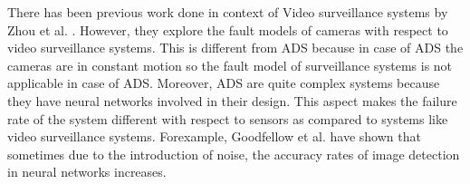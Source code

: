 There has been previous work done in context of Video surveillance systems by Zhou et al. \cite{Zhou}. However, they explore the fault models of cameras with respect to video surveillance systems. This is different from ADS because in case of ADS the cameras are in constant motion so the fault model of surveillance systems is not applicable in case of ADS. Moreover, ADS are quite complex systems because they have neural networks involved in their design. This aspect makes the failure rate of the system different with respect to sensors as compared to systems like video surveillance systems. Forexample, Goodfellow et al. \cite{Goodfellow} have shown that sometimes due to the introduction of noise, the accuracy rates of image detection in neural networks increases.